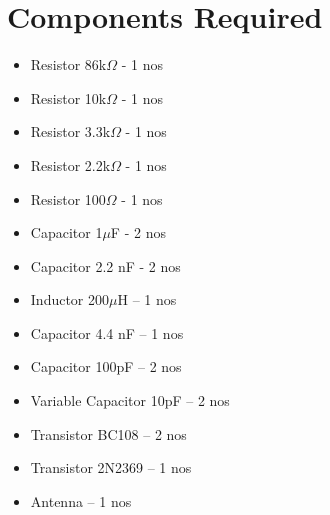 \chapter{Components Required}

\begin{itemize}
	
	\item Resistor 86k$\Omega$ - 1 nos
	\item Resistor 10k$\Omega$ - 1 nos
	\item Resistor 3.3k$\Omega$ - 1 nos
	\item Resistor 2.2k$\Omega$ - 1 nos
	\item Resistor 100$\Omega$ - 1 nos
	\item Capacitor 1$\mu$F - 2 nos
	\item Capacitor 2.2 nF - 2 nos
		    \item Inductor 200$\mu$H – 1 nos
	\item Capacitor 4.4 nF – 1 nos
	\item Capacitor 100pF – 2 nos
	\item Variable Capacitor 10pF – 2 nos
	\item Transistor BC108 – 2 nos
	\item Transistor 2N2369 – 1 nos
	\item Antenna – 1 nos					
\end{itemize}